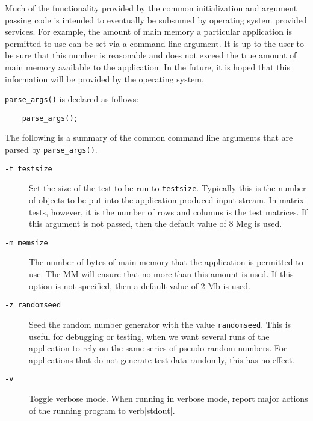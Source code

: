 Much of the functionality provided by the common initialization and
argument passing code is intended to eventually be subsumed by
operating system provided services.  For example, the amount of main
memory a particular application is permitted to use can be set via a
command line argument.  It is up to the user to be sure that this
number is reasonable and does not exceed the true amount of main
memory available to the application.  In the future, it is hoped that
this information will be provided by the operating system.

\verb|parse_args()| is declared as follows:

\begin{verbatim}
    parse_args();
\end{verbatim}


The following is a summary of the common command line arguments that
are parsed by \verb|parse_args()|.
\begin{description}
\item[\verb|-t testsize|]
Set the size of the test to be run to \verb|testsize|.  Typically this
is the number of objects to be put into the application produced input
stream.  In matrix tests, however, it is the number of rows and
columns is the test matrices.  If this argument is not passed, then
the default value of 8 Meg is used.
\item[\verb|-m memsize|]
The number of bytes of main memory that the application is permitted to
use.  The MM will ensure that no more than this amount is
used.  If this option is not specified, then a default value of 2 Mb
is used.
\item[\verb|-z randomseed|]
Seed the random number generator with the value \verb|randomseed|.
This is useful for debugging or testing, when we want several runs of
the application to rely on the same series of pseudo-random numbers.
For applications that do not generate test data randomly, this has no
effect. 
\item[\verb|-v|]
Toggle verbose mode.  When running in verbose mode, report major
actions of the running program to verb|stdout|.
\end{description}

